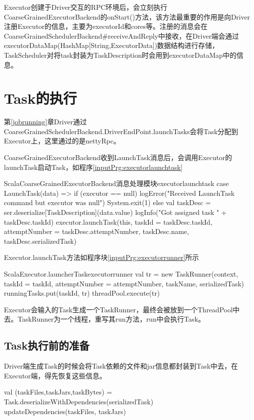 Executor创建于Driver交互的RPC环境后，会立刻执行CoarseGrainedExecutorBackend的onStart()方法，该方法最重要的作用是向Driver注册Executor的信息，主要为executorId和cores等。注册的消息会在CoarseGrainedSchedulerBackend\#receiveAndReply中接收，在Driver端会通过executorDataMap(HashMap[String,ExecutorData])数据结构进行存储，TaskScheduler对将task封装为TaskDescription时会用到executorDataMap中的信息。
\section{Task的执行}

第\ref{jobrunning}章Driver通过CoarseGrainedSchedulerBackend.DriverEndPoint.launchTasks会将Task分配到Executor上，这里通过的是nettyRpc。

CoarseGrainedExecutorBackend收到LaunchTask消息后，会调用Executor的launchTask启动Task，如程序\ref{inputPrg:executorlaunchtask}
\begin{codeInput}{Scala}{CoarseGrainedExecutorBackend消息处理模块}{executorlaunchtask}
case LaunchTask(data) =>
  if (executor == null) {
    logError("Received LaunchTask command but executor was null")
    System.exit(1)
  } else {
    val taskDesc = ser.deserialize[TaskDescription](data.value)
    logInfo("Got assigned task " + taskDesc.taskId)
    executor.launchTask(this, taskId = taskDesc.taskId, attemptNumber = taskDesc.attemptNumber,
    taskDesc.name, taskDesc.serializedTask)
}
\end{codeInput}

Executor.launchTask方法如程序块\ref{inputPrg:executorrunner}所示
\begin{codeInput}{Scala}{Executor.launcherTask}{executorrunner}
val tr = new TaskRunner(context, taskId = taskId, attemptNumber = attemptNumber, taskName,
serializedTask)
runningTasks.put(taskId, tr)
threadPool.execute(tr)
\end{codeInput}

Executor会输入的Task生成一个TaskRunner，最终会被放到一个ThreadPool中去。TaskRunner为一个线程，重写其run方法，run中会执行Task。

\subsection{Task执行前的准备}

Driver端生成Task的时候会将Task依赖的文件和jar信息都封装到Task中去，在Executor端，得先恢复这些信息。
\begin{orgianlboxnotitle}
  val (taskFiles,taskJars,taskBytes) = Task.deserializeWithDependencies(serializedTask)\\
  updateDependencies(taskFiles, taskJars)
\end{orgianlboxnotitle}

